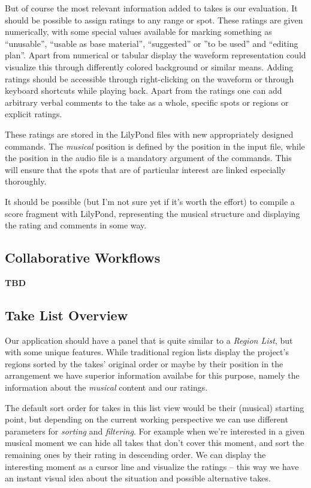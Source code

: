 \documentclass[11pt,a4paper]{article}
\begin{document}
But of course the most relevant information added to takes is our evaluation.
It should be possible to assign ratings to any range or spot.
These ratings are given numerically, with some special values available for marking something as “unusable”, “usable as base material”, “suggested” or ”to be used” and “editing plan”.
Apart from numerical or tabular display the waveform representation could visualize this through differently colored background or similar means.
Adding ratings should be accessible through right-clicking on the waveform or through keyboard shortcuts while playing back.
Apart from the ratings one can add arbitrary verbal comments to the take as a whole, specific spots or regions or explicit ratings.

These ratings are stored in the LilyPond files with new appropriately designed commands.
The \emph{musical} position is defined by the position in the input file, while the position in the audio file is a mandatory argument of the commands.
This will ensure that the spots that are of particular interest are linked especially thoroughly.

It should be possible (but I'm not sure yet if it's worth the effort) to compile a score fragment with LilyPond, representing the musical structure and displaying the rating and comments in some way.

\subsection{Collaborative Workflows}

\textbf{TBD}

\subsection{Take List Overview}
Our application should have a panel that is quite similar to a \emph{Region List}, but with some unique features.
While traditional region lists display the project's regions sorted by the takes' original order or maybe by their position in the arrangement we have superior information availabe for this purpose, namely the information about the \emph{musical} content and our ratings.

The default sort order for takes in this list view would be their (musical) starting point, but depending on the current working perspective we can use different parameters for \emph{sorting} and \emph{filtering}.
For example when we're interested in a given musical moment we can hide all takes that don't cover this moment, and sort the remaining ones by their rating in descending order.
We can display the interesting moment as a cursor line and visualize the ratings -- this way we have an instant visual idea about the situation and possible alternative takes.
\end{document}
